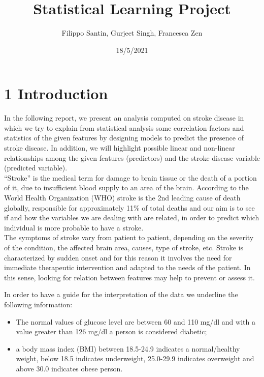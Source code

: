\documentclass[
]{article}
\title{Statistical Learning Project}
\author{Filippo Santin, Gurjeet Singh, Francesca Zen}
\date{18/5/2021}
\providecommand{\tightlist}{%
  \setlength{\itemsep}{0pt}\setlength{\parskip}{0pt}}
\begin{document}
\maketitle

\hypertarget{introduction}{%
\section{1 Introduction}\label{introduction}}

In the following report, we present an analysis computed on stroke
disease in which we try to explain from statistical analysis some
correlation factors and statistics of the given features by designing
models to predict the presence of stroke disease. In addition, we will
highlight possible linear and non-linear relationships among the given
features (predictors) and the stroke disease variable (predicted
variable).\\
``Stroke'' is the medical term for damage to brain tissue or the death
of a portion of it, due to insufficient blood supply to an area of the
brain. According to the World Health Organization (WHO) stroke is the
2nd leading cause of death globally, responsible for approximately 11\%
of total deaths and our aim is to see if and how the variables we are
dealing with are related, in order to predict which individual is more
probable to have a stroke.\\
The symptoms of stroke vary from patient to patient, depending on the
severity of the condition, the affected brain area, causes, type of
stroke, etc. Stroke is characterized by sudden onset and for this reason
it involves the need for immediate therapeutic intervention and adapted
to the needs of the patient. In this sense, looking for relation between
features may help to prevent or assess it.

In order to have a guide for the interpretation of the data we underline
the following information:

\begin{itemize}
\tightlist
\item
  The normal values of glucose level are between 60 and 110 mg/dl and
  with a value greater than 126 mg/dl a person is considered diabetic;
\item
  a body mass index (BMI) between 18.5-24.9 indicates a normal/healthy
  weight, below 18.5 indicates underweight, 25.0-29.9 indicates
  overweight and above 30.0 indicates obese person.
\end{itemize}
\end{document}
